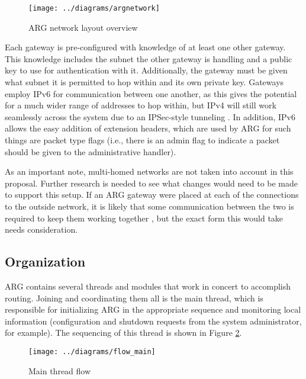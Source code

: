 \begin{figure}
	\centering
	\texttt{[image: ../diagrams/argnetwork]}
	\caption{ARG network layout overview}
	\label{fig:argnetwork}
\end{figure}

\par Each gateway is pre-configured with knowledge of at least one other gateway. This knowledge includes the subnet the other gateway is handling and a public key to use for authentication with it. Additionally, the gateway must be given what subnet it is permitted to hop within and its own private key. Gateways employ IPv6 for communication between one another, as this gives the potential for a much wider range of addresses to hop within, but IPv4 will still work seamlessly across the system due to an IPSec-style tunneling \cite{rfc4301}. In addition, IPv6 allows the easy addition of extension headers, which are used by ARG for such things are packet type flags (i.e., there is an admin flag to indicate a packet should be given to the administrative handler).

\par As an important note, multi-homed networks are not taken into account in this proposal. Further research is needed to see what changes would need to be made to support this setup. If an ARG gateway were placed at each of the connections to the outside network, it is likely that some communication between the two is required to keep them working together \cite{SandiaDynat}, but the exact form this would take needs consideration.

\subsection{Organization}
\par ARG contains several threads and modules that work in concert to accomplish routing. Joining and coordinating them all is the main thread, which is responsible for initializing ARG in the appropriate sequence and monitoring local information (configuration and shutdown requests from the system administrator, for example). The sequencing of this thread is shown in Figure \ref{fig:flow_main}.

\begin{figure}
	\centering
	\texttt{[image: ../diagrams/flow\_main]}
	\caption{Main thread flow}
	\label{fig:flow_main}
\end{figure}

